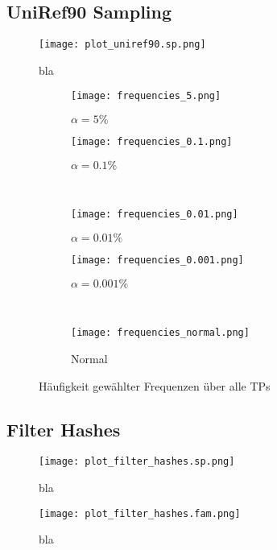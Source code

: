     \subsection{UniRef90 Sampling} %
        \label{sub:uniref90_results}
        \begin{figure}[H]
            \centering
            \texttt{[image: plot\_uniref90.sp.png]}
            \caption{bla}
            \label{fig:uniref90.sp}
        \end{figure}
        \begin{figure}[H]
            \centering
            \begin{subfigure}{.45\textwidth}
                \texttt{[image: frequencies\_5.png]}
                \caption{$\alpha=5\%$}
                \label{fig:frequencies_5}
            \end{subfigure}
            \begin{subfigure}{.45\textwidth}
                \texttt{[image: frequencies\_0.1.png]}
                \caption{$\alpha=0.1\%$}
                \label{fig:frequencies_0.1}
            \end{subfigure}\\
            \begin{subfigure}{.45\textwidth}
                \texttt{[image: frequencies\_0.01.png]}
                \caption{$\alpha=0.01\%$}
                \label{fig:frequencies_0.01}
            \end{subfigure}
            \begin{subfigure}{.45\textwidth}
                \texttt{[image: frequencies\_0.001.png]}
                \caption{$\alpha=0.001\%$}
                \label{fig:frequencies_0.001}
            \end{subfigure}\\
            \begin{subfigure}{.45\textwidth}
                \texttt{[image: frequencies\_normal.png]}
                \caption{Normal}
                \label{fig:frequencies_normal}
            \end{subfigure}
            \caption{Häufigkeit gewählter Frequenzen über alle \aclp{TP}}
            \label{fig:frequencies}
        \end{figure}
    
    \subsection{Filter Hashes} %
        \label{sub:filter_results}
        \begin{figure}[H]
            \centering
            \texttt{[image: plot\_filter\_hashes.sp.png]}
            \caption{bla}
            \label{fig:filter_hashes.sp}
        \end{figure}
        \begin{figure}[H]
            \centering
            \texttt{[image: plot\_filter\_hashes.fam.png]}
            \caption{bla}
            \label{fig:filter_hashes.fam}
        \end{figure}

